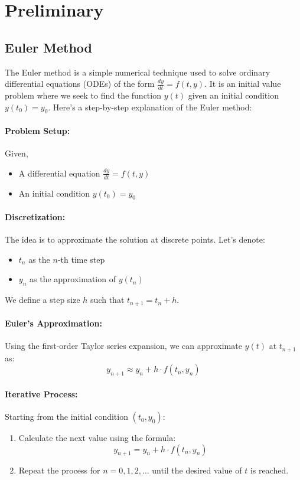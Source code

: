 \section{Preliminary}
\label{sec:node_preliminary}

\subsection{Euler Method}
The Euler method is a simple numerical technique used to solve ordinary differential equations (ODEs) of the form \( \frac{dy}{dt} = f(t, y) \). It is an initial value problem where we seek to find the function \( y(t) \) given an initial condition \( y(t_0) = y_0 \). Here's a step-by-step explanation of the Euler method:


\paragraph{Problem Setup:} Given,
\begin{itemize}
	\item A differential equation \( \frac{dy}{dt} = f(t, y) \)
	\item An initial condition \( y(t_0) = y_0 \)
\end{itemize}

\paragraph{Discretization:} The idea is to approximate the solution at discrete points. Let's denote:
\begin{itemize}
	\item \( t_n \) as the \( n \)-th time step
	\item \( y_n \) as the approximation of \( y(t_n) \)
\end{itemize}
We define a step size \( h \) such that \( t_{n+1} = t_n + h \).

\paragraph{Euler's Approximation:} Using the first-order Taylor series expansion, we can approximate \( y(t) \) at \( t_{n+1} \) as:
\[ y_{n+1} \approx y_n + h \cdot f(t_n, y_n) \]

\paragraph{Iterative Process:} Starting from the initial condition \( (t_0, y_0) \):
\begin{enumerate}
	\item Calculate the next value using the formula:
	\[ y_{n+1} = y_n + h \cdot f(t_n, y_n) \]
	\item Repeat the process for \( n = 0, 1, 2, \ldots \) until the desired value of \( t \) is reached.
\end{enumerate}

